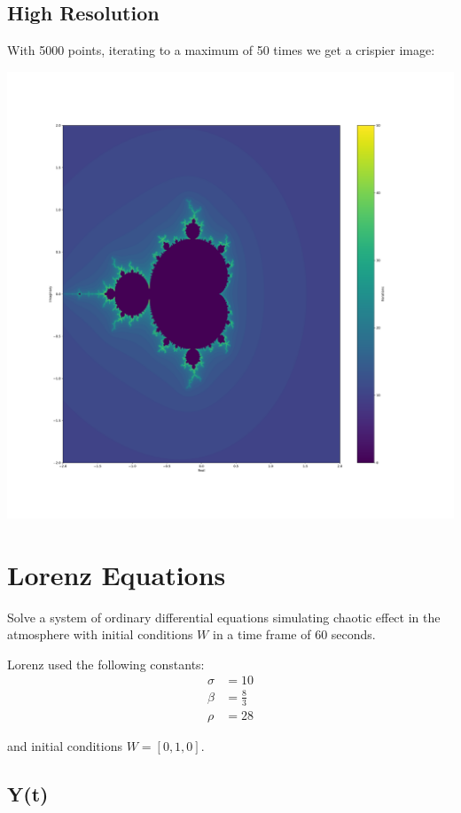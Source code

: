 \documentclass{article}
\begin{document}
\subsection{High Resolution}

With 5000 points, iterating to a maximum of 50 times we get a crispier image:

\includegraphics[scale=0.2]{mandelbrot_50.pdf}

\section{Lorenz Equations}

Solve a system of ordinary differential equations simulating chaotic effect
in the atmosphere with initial conditions $W$ in a time frame of 60 seconds.

Lorenz used the following constants:
\begin{align*}
    \sigma &= 10\\
    \beta &= \frac{8}{3}\\
    \rho &= 28
\end{align*}

and initial conditions $W = [0, 1, 0]$.

\subsection{Y(t)}
\end{document}
